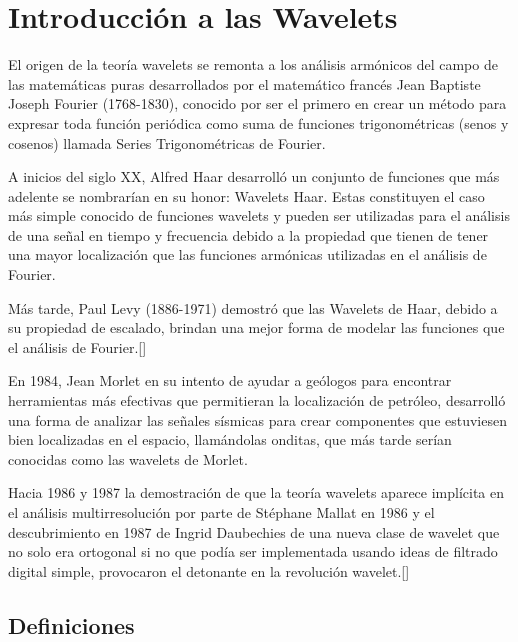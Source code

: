 \section{Introducci\'on a las Wavelets}

\par El origen de la teor\'ia wavelets se remonta a los an\'alisis arm\'onicos del campo de las matem\'aticas puras desarrollados por el matem\'atico franc\'es Jean Baptiste Joseph Fourier (1768-1830), conocido por ser el primero en crear un m\'etodo para expresar toda funci\'on peri\'odica como suma de funciones trigonom\'etricas (senos y cosenos) llamada Series Trigonom\'etricas de Fourier.

\par A inicios del siglo XX, Alfred Haar desarroll\'o un conjunto de funciones que m\'as adelente se nombrar\'ian en su honor: Wavelets Haar. Estas constituyen el caso m\'as simple conocido de funciones wavelets y pueden ser utilizadas para el an\'alisis de una se\~nal en tiempo y frecuencia debido a la propiedad que tienen de tener una mayor localizaci\'on que las funciones arm\'onicas utilizadas en el an\'alisis de Fourier.

\par M\'as tarde, Paul Levy (1886-1971) demostr\'o que las Wavelets de Haar, debido a su propiedad de escalado, brindan una mejor forma de modelar las funciones que el an\'alisis de Fourier.[\textcolor{cyan}{\cite{6}}]

\par En 1984, Jean Morlet en su intento de ayudar a ge\'ologos para encontrar herramientas m\'as efectivas que permitieran la localizaci\'on de petr\'oleo, desarroll\'o una forma de analizar las se\~nales s\'ismicas para crear componentes que estuviesen bien localizadas en el espacio, llam\'andolas onditas, que m\'as tarde ser\'ian conocidas como las wavelets de Morlet.

\par Hacia 1986 y 1987 la demostraci\'on de que la teor\'ia wavelets aparece impl\'icita en el an\'alisis multirresoluci\'on por parte de Stéphane Mallat en 1986 y el descubrimiento en 1987 de Ingrid Daubechies de una nueva clase de wavelet que no solo era ortogonal si no que pod\'ia ser implementada usando ideas de filtrado digital simple, provocaron el detonante en la revoluci\'on wavelet.[\textcolor{cyan}{\cite{7}}]

\subsection{Definiciones}

